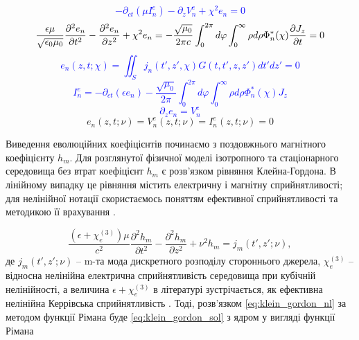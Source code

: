 \textcolor{blue}{ \begin{equation*}
- \partial_{ct}(\mu I_n^e) - \partial_z V_n^e + \chi^2 e_n = 0
\end{equation*} }
%
\textcolor{blue}{ \begin{equation*}
\frac{\epsilon \mu}{ \sqrt{\epsilon_0 \mu_0}} 
\frac{\partial^2 e_n}{\partial t^2} - 
\frac{\partial^2 e_n}{\partial z^2} + \chi^2 e_n = 
- \frac{\sqrt{\mu_0}}{2 \pi c} 
\int_0^{2\pi} d \varphi 
\int_0^\infty \rho d \rho \Phi_n^* (\chi) \frac{\partial J_z}{\partial t} = 0
\end{equation*} }
%
\textcolor{blue}{ \begin{equation*}
e_n (z, t; \chi) = \iint_S j_n (t',z', \chi) G(t,t',z,z') dt' dz' = 0
\end{equation*} }
%
\textcolor{blue}{ \begin{equation*}
I_n^e = - \partial_{ct} (\epsilon e_n) - 
\frac{\sqrt{\mu_0}}{2 \pi} \int_0^{2\pi} d \varphi 
\int_0^{\infty} \rho d \rho \Phi_n^* (\chi) J_z
\end{equation*} }
%
\textcolor{blue}{ \begin{equation*}
\partial_{z} e_n = V_n^e
\end{equation*} }
%
\begin{equation} \label{eq:e_evolution}
e_n (z, t; \nu) = V_n^e (z, t; \nu) = I_n^e (z, t; \nu) = 0
\end{equation}

Виведення еволюційних коефіцієнтів починаємо з поздовжнього 
магнітного коефіцієнту $ h_m $. Для розглянутої фізичної моделі ізотропного
та стаціонарного середовища без втрат коефіцієнт $ h_m $ є розв'язком 
рівняння Клейна-Гордона. В лінійному випадку це рівняння містить електричну 
і магнітну сприйнятливості; для нелінійної нотації скористаємось поняттям 
ефективної сприйнятливості та методикою її врахування \cite{imp:Ziolkowski1993}.

\begin{equation} \label{eq:klein_gordon_nl}
\frac{(\epsilon + \chi_e^{(3)}) \mu}{c^2} 
\frac{\partial^2 h_m}{\partial t^2} - 
\frac{\partial^2 h_m}{\partial z^2} + 
\nu^2 h_m = j_m (t',z'; \nu),
\end{equation}
%
де $ j_m (t',z'; \nu) $ -- m-та мода дискретного розподілу стороннього 
джерела, $ \chi_e^{(3)} $ -- відносна нелінійна електрична сприйнятливість 
середовища при кубічній нелінійності, а величина $ \epsilon + \chi_e^{(3)} $ в 
літературі зустрічається, як ефективна нелінійна Керрівська сприйнятливість 
\cite{imp:Ziolkowski1993}. Тоді, розв'язком \eqref{eq:klein_gordon_nl} за 
методом функції Рімана буде \eqref{eq:klein_gordon_sol} з ядром у вигляді 
функції Рімана

